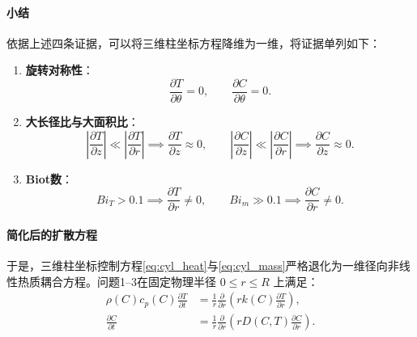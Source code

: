 \documentclass[12pt,a4paper,fontset=none]{ctexart}
\begin{document}
\paragraph{小结}
依据上述四条证据，可以将三维柱坐标方程降维为一维，将证据单列如下：
\begin{enumerate}[label=(\arabic*)]
  \item \textbf{旋转对称性}：
  \begin{equation}
  \frac{\partial T}{\partial\theta} = 0,\qquad \frac{\partial C}{\partial\theta} = 0.\label{eq:theta_zero}
  \end{equation}
  \item \textbf{大长径比与大面积比}：
  \begin{equation}
  \left|\frac{\partial T}{\partial z}\right|\ll\left|\frac{\partial T}{\partial r}\right| \implies \frac{\partial T}{\partial z} \approx 0,\qquad
  \left|\frac{\partial C}{\partial z}\right|\ll\left|\frac{\partial C}{\partial r}\right| \implies \frac{\partial C}{\partial z} \approx 0.\label{eq:z_zero}
  \end{equation}
  \item \textbf{Biot数}：
  \begin{equation}
  Bi_T > 0.1 \implies \frac{\partial T}{\partial r} \neq 0,\qquad
  Bi_m \gg 0.1 \implies \frac{\partial C}{\partial r} \neq 0.\label{eq:r_nonzero}
  \end{equation}
\end{enumerate}

\paragraph{简化后的扩散方程}
于是，三维柱坐标控制方程\eqref{eq:cyl_heat}与\eqref{eq:cyl_mass}严格退化为一维径向非线性热质耦合方程。问题1--3在固定物理半径 $0\le r\le R$ 上满足：
\begin{align}
\rho(C)c_p(C)\frac{\partial T}{\partial t}
&=\frac1r\frac{\partial}{\partial r}\left(rk(C)\frac{\partial T}{\partial r}\right),\label{eq:heat}\\[10pt]
\frac{\partial C}{\partial t}
&=\frac1r\frac{\partial}{\partial r}\left(rD(C,T)\frac{\partial C}{\partial r}\right).\label{eq:mass}
\end{align}
\end{document}
